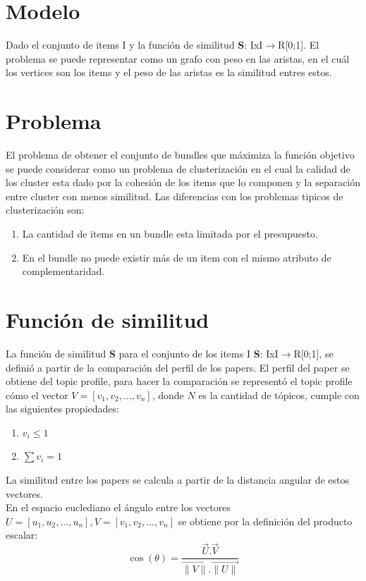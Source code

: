 \section{Modelo}
Dado el conjunto de items I y la función de similitud \textbf{S}: IxI$\rightarrow$R[0;1]. El problema se puede representar como un grafo 
con peso en las aristas, en el cuál los vertices son los items y el peso de las aristas es la similitud entres estos.
\section{Problema}
El problema de obtener el conjunto de bundles que máximiza la función objetivo se puede considerar como un problema
de clusterización en el cual la calidad de los cluster esta dado por la cohesión de los items que lo componen y la
separación entre cluster con menos similitud.
Las diferencias con los problemas tipicos de clusterización son:
\begin{enumerate}
 \item La cantidad de items en un bundle esta limitada por el presupuesto.
 \item En el bundle no puede existir más de un item con el mismo atributo de complementaridad.
\end{enumerate}
\section{Función de similitud}
La función de similitud \textbf{S} para el conjunto de los items I \textbf{S}: IxI$\rightarrow$R[0;1],
se definió a partir de la comparación del perfil de los papers. El perfil del paper se obtiene del topic profile, 
para hacer la comparación se representó el topic profile cómo el vector $V = [v_1,v_2,...,v_n]$, donde $N$ es la cantidad de tópicos,
cumple con las siguientes propiedades:
\begin{enumerate}
 \item $v_i \leqslant 1$
 \item $\sum{v_i} = 1$
\end{enumerate}

La similitud entre los papers se calcula a partir de la distancia angular de estos vectores.\\

En el espacio euclediano el ángulo entre los vectores $U = [u_1,u_2,...,u_n], V = [v_1,v_2,...,v_n]$ se obtiene por la definición del producto escalar:\\
\begin{equation} \label{eq:angulovectorial}
\cos(\theta) =  \dfrac{\overrightarrow{U} . \overrightarrow{V}}{\overrightarrow{\lVert V\lVert}.\overrightarrow{\lVert U\lVert}}
\end{equation}

